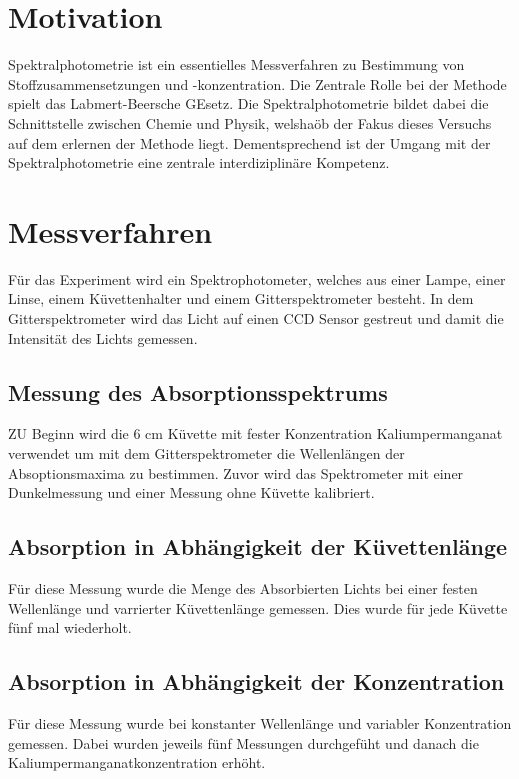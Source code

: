 \section{Motivation}

Spektralphotometrie ist ein essentielles Messverfahren zu Bestimmung
von Stoffzusammensetzungen und -konzentration. Die Zentrale Rolle bei
der Methode spielt das Labmert-Beersche GEsetz. Die Spektralphotometrie
bildet dabei die Schnittstelle zwischen Chemie und Physik, welshaöb der
Fakus dieses Versuchs auf dem erlernen der Methode liegt. Dementsprechend
ist der Umgang mit der Spektralphotometrie eine zentrale interdiziplinäre Kompetenz.


\section{Messverfahren}
Für das Experiment wird ein Spektrophotometer, welches aus einer Lampe, einer Linse, einem Küvettenhalter und einem
Gitterspektrometer besteht. In dem Gitterspektrometer wird das Licht auf einen CCD Sensor gestreut und damit die
Intensität des Lichts gemessen.

\subsection{Messung des Absorptionsspektrums}
ZU Beginn wird die 6 cm Küvette mit fester Konzentration Kaliumpermanganat verwendet um mit dem Gitterspektrometer
die Wellenlängen der Absoptionsmaxima zu bestimmen. Zuvor wird das Spektrometer mit einer Dunkelmessung und 
einer Messung ohne Küvette kalibriert.

\subsection{Absorption in Abhängigkeit der Küvettenlänge}
Für diese Messung wurde die Menge des Absorbierten Lichts bei einer festen Wellenlänge und varrierter
Küvettenlänge gemessen. Dies wurde für jede Küvette fünf mal wiederholt.

\subsection{Absorption in Abhängigkeit der Konzentration}

Für diese Messung wurde bei konstanter Wellenlänge und variabler Konzentration gemessen. Dabei wurden jeweils fünf Messungen
durchgefüht und danach die Kaliumpermanganatkonzentration erhöht.



